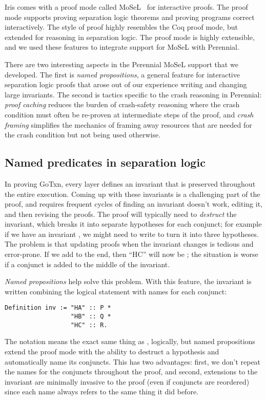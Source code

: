 Iris comes with a proof mode called MoSeL~\cite{krebbers:ipm,krebbers:mosel} for
interactive proofs. The proof mode supports proving separation logic theorems
and proving programs correct interactively. The style of proof highly resembles
the Coq proof mode, but extended for reasoning in separation logic. The proof
mode is highly extensible, and we used these features to integrate support for
MoSeL with Perennial.

There are two interesting aspects in the Perennial MoSeL support that we
developed.
The first is \emph{named propositions}, a general feature for
interactive separation logic proofs that arose out of our experience writing and
changing large invariants. The second is tactics specific to the crash reasoning
in Perennial: \emph{proof caching} reduces the burden of crash-safety reasoning
where the crash condition must often be re-proven at intermediate steps of the
proof, and \emph{crash framing} simplifies the mechanics of framing away
resources that are needed for the crash condition but not being used otherwise.

\subsection{Named predicates in separation logic}

In proving GoTxn, every layer defines an invariant that is preserved throughout
the entire execution. Coming up with these invariants is a challenging part of
the proof, and requires frequent cycles of finding an invariant doesn't work,
editing it, and then revising the proofs. The proof will typically need to
\emph{destruct} the invariant, which breaks it into separate hypotheses for each
conjunct; for example if we have an invariant , we might
need to write  to turn it into three
hypotheses. The problem is that updating proofs when the invariant changes is
tedious and error-prone. If we add  to the end, then ``HC'' will now be
; the situation is worse if a conjunct is added to the middle of the
invariant.

\emph{Named propositions} help solve this problem. With this feature, the
invariant is written combining the logical statement with names for each conjunct:
\begin{verbatim}
Definition inv := "HA" :: P *
                  "HB" :: Q *
                  "HC" :: R.
\end{verbatim}
The notation  means the exact same thing as , logically, but
named propositions extend the proof mode with the ability to destruct a hypothesis and
automatically name its conjuncts. This has two advantages: first, we don't repeat
the names for the conjuncts throughout the proof, and second, extensions to the
invariant are minimally invasive to the proof (even if conjuncts are reordered)
since each name always refers to the same thing it did before.

